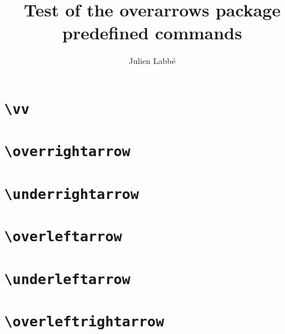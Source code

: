 \documentclass[12pt]{article}
\title{Test of the \textsf{overarrows} package\\ predefined commands}
\author{Julien Labb\'e}
\begin{document}
\maketitle

\section{\texttt{\textbackslash vv}}

\begin{dispExample}
  \TestOverArrow*{\vv}
\end{dispExample}

\section{\texttt{\textbackslash overrightarrow}}

\begin{dispExample}
  \TestOverArrow{\overrightarrow}
\end{dispExample}

\section{\texttt{\textbackslash underrightarrow}}

\begin{dispExample}
  \TestOverArrow{\underrightarrow}
\end{dispExample}

\section{\texttt{\textbackslash overleftarrow}}

\begin{dispExample}
  \TestOverArrow{\overleftarrow}
\end{dispExample}

\section{\texttt{\textbackslash underleftarrow}}

\begin{dispExample}
  \TestOverArrow{\underleftarrow}
\end{dispExample}

\section{\texttt{\textbackslash overleftrightarrow}}
\end{document}

